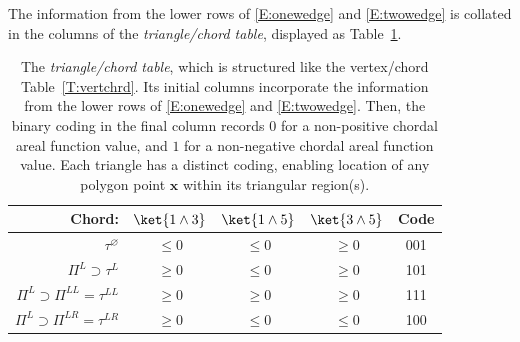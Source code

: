 \documentclass[12pt]{amsart}
\theoremstyle{plain}
\theoremstyle{definition}
\numberwithin{equation}{section}
\begin{document}
The information from the lower rows of \eqref{E:onewedge} and \eqref{E:twowedge} is collated in the columns of the \emph{triangle/chord table}, displayed as Table~\ref{T:VerChTab}.

\renewcommand{\arraystretch}{1.5}
\begin{table}[hbt]
\begin{tabular}{||r||c|c|c||c||}
\hline
Chord: &$\ket{1\wedge3}$ &$\ket{1\wedge5}$ &$\ket{3\wedge5}$ &Code\\
\hline
$\tau^{\varnothing}$ &$\le0$ &$\le0$ &$\ge0$ &001\\
\hline
$\Pi^L\supset\tau^{L}$ &$\ge0$ &$\le0$ &$\ge0$ &101\\
\hline
$\Pi^L\supset\Pi^{LL}=\tau^{LL}$ &$\ge0$ &$\ge0$ &$\ge0$ &111\\
\hline
$\Pi^L\supset\Pi^{LR}=\tau^{LR}$ &$\ge0$ &$\le0$ &$\le0$ &100\\
\hline
\end{tabular}
\vskip 4mm
\caption{The \emph{triangle/chord table}, which is structured like the vertex/chord Table~\ref{T:vertchrd}. Its initial columns incorporate the information from the lower rows of \eqref{E:onewedge} and \eqref{E:twowedge}. Then, the binary coding in the final column records $0$ for a non-positive chordal areal function value, and $1$ for a non-negative chordal areal function value. Each triangle has a distinct coding, enabling location of any polygon point $\mathbf x$ within its triangular region(s).}
\label{T:VerChTab}
\end{table}
\end{document}
